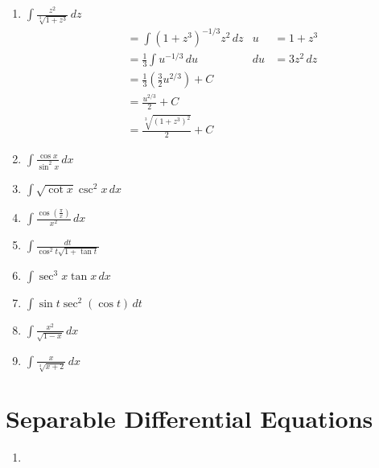 \documentclass[12pt]{article}
\newcommand{\mins}{-}
\newcommand{\inline}[1]{\({#1}\)}
\begin{document}
\begin{enumerate}
        \item \inline{\int{} \frac{z^2}{\sqrt[3]{1 + z^3}} \, dz}
        \begin{align*}
            &= \int{} {(1 + z^3)}^{-1/3} z^2 \, dz                           & u &= 1 + z^3 \\
            &= \frac{1}{3} \int{} u^{-1/3} \, du                             & du &= 3z^2 \, dz \\
            &= \frac{1}{3} \left(\frac{3}{2} u^{2/3}\right) + C \\
            &= \frac{u^{2/3}}{2} + C \\
            &= \frac{\sqrt[3]{{(1 + z^3)}^2}}{2} + C
        \end{align*}

        \item \inline{\int{} \frac{\cos{x}}{\sin^2{x}} \, dx}
        \item \inline{\int{} \sqrt{\cot{x}} \csc^2{x} \, dx}
        \item \inline{\int{} \frac{\cos{(\frac{\pi{}}{x})}}{x^2} \, dx}
        \item \inline{\int{} \frac{dt}{\cos^2{t} \sqrt{1 + \tan{t}}}}
        \item \inline{\int{} \sec^3{x} \tan{x} \, dx}
        \item \inline{\int{} \sin{t} \sec^2{(\cos{t})} \, dt}
        \item \inline{\int{} \frac{x^2}{\sqrt{1 \mins{} x}} \, dx}
        \item \inline{\int{} \frac{x}{\sqrt[4]{x + 2}} \, dx}
    \end{enumerate}

\newpage\section{Separable Differential Equations}
    \begin{enumerate}
        \item 
    \end{enumerate}
\end{document}
